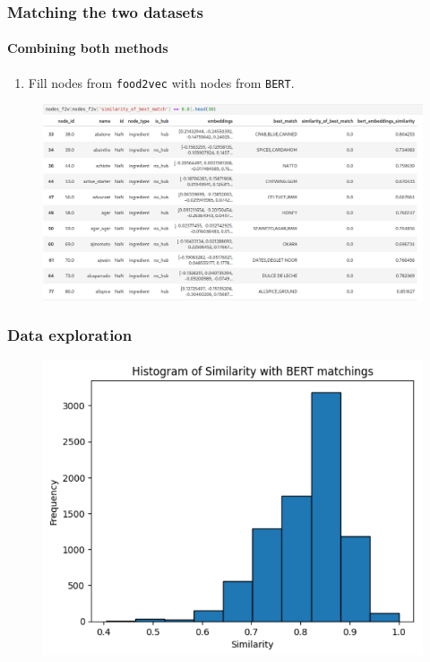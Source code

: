 \documentclass{beamer}
\begin{document}
\begin{frame}
	\frametitle{Matching the two datasets}
	\framesubtitle{Combining both methods}
	\begin{enumerate}
		\item Fill nodes from \texttt{food2vec} with nodes from \texttt{BERT}.
	\end{enumerate}
	\begin{figure}[H]
		\centering
		\includegraphics[width=\linewidth]{img/match_combo.png}
	\end{figure}
\end{frame}

\begin{frame}
	\frametitle{Data exploration}
	\begin{figure}[H]
		\centering
		\includegraphics[width=0.9\linewidth]{img/plot_sim_bert.png}
	\end{figure}
\end{frame}
\end{document}
